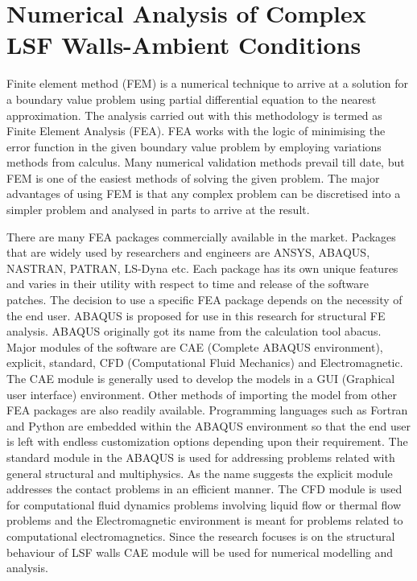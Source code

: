 \section{Numerical Analysis of Complex LSF Walls-Ambient Conditions}

Finite element method (FEM) is a numerical technique to arrive at a solution for a boundary value problem using partial differential equation to the nearest approximation. The analysis carried out with this methodology is termed as Finite Element Analysis (FEA). FEA works with the logic of minimising the error function in the given boundary value problem by employing variations methods from calculus. Many numerical validation methods prevail till date, but FEM is one of the easiest methods of solving the given problem. The major advantages of using FEM is that any complex problem can be discretised into a simpler problem and analysed in parts to arrive at the result. 

There are many FEA packages commercially available in the market. Packages that are widely used by researchers and engineers are ANSYS, ABAQUS, NASTRAN, PATRAN, LS-Dyna etc. Each package has its own unique features and varies in their utility with respect to time and release of the software patches. The decision to use a specific FEA package depends on the necessity of the end user. ABAQUS is proposed for use in this research for structural FE analysis. ABAQUS originally got its name from the calculation tool abacus. Major modules of the software are CAE (Complete ABAQUS environment), explicit, standard, CFD (Computational Fluid Mechanics) and Electromagnetic. The CAE module is generally used to develop the models in a GUI (Graphical user interface) environment. Other methods of importing the model from other FEA packages are also readily available. Programming languages such as Fortran and Python are embedded within the ABAQUS environment so that the end user is left with endless customization options depending upon their requirement. The standard module in the ABAQUS is used for addressing problems related with general structural and multiphysics. As the name suggests the explicit module addresses the contact problems in an efficient manner. The CFD module is used for computational fluid dynamics problems involving liquid flow or thermal flow problems and the Electromagnetic environment is meant for problems related to computational electromagnetics. Since the research focuses is on the structural behaviour of LSF walls CAE module will be used for numerical modelling and analysis.


